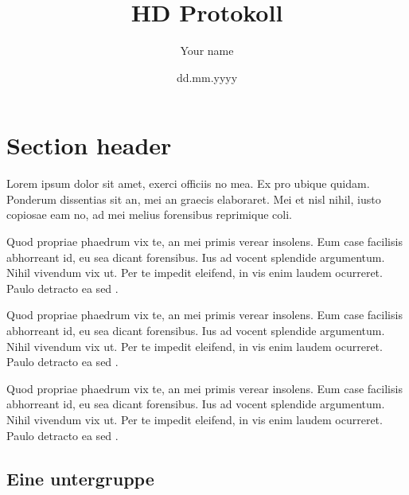 \documentclass[%
 12pt,           %
 english,        %
 a4paper,        %
 DIV14,          %
 twoside,        %
 thesis,         %
 impberklaerung, %
]{hdprotokoll}   %
\title{HD Protokoll}
\author{Your name}
\date{dd.mm.yyyy}
\institute{free text}
\begin{document}
\maketitle                       %
\cleardoublepage                 %

\tableofcontents                 %

\newpage        			     %
\printglossaries                 %

\cleardoublepage                 %


\section{Section header}
Lorem ipsum dolor sit amet, exerci officiis no mea. Ex pro ubique quidam. Ponderum dissentias sit an, mei an graecis elaboraret. Mei et nisl nihil, iusto copiosae eam no, ad mei melius forensibus reprimique \gls{coli}.

Quod propriae phaedrum vix te, an mei primis verear insolens. Eum case facilisis abhorreant id, eu sea dicant forensibus. Ius ad vocent splendide argumentum. Nihil vivendum vix ut. Per te impedit eleifend, in vis enim laudem ocurreret. Paulo detracto ea sed \citep{hector1999plant}.

Quod propriae phaedrum vix te, an mei primis verear insolens. Eum case facilisis abhorreant id, eu sea dicant forensibus. Ius ad vocent splendide argumentum. Nihil vivendum vix ut. Per te impedit eleifend, in vis enim laudem ocurreret. Paulo detracto ea sed \citep{hector1999plant}.

Quod propriae phaedrum vix te, an mei primis verear insolens. Eum case facilisis abhorreant id, eu sea dicant forensibus. Ius ad vocent splendide argumentum. Nihil vivendum vix ut. Per te impedit eleifend, in vis enim laudem ocurreret. Paulo detracto ea sed \citep{hector1999plant}.

\subsection{Eine untergruppe}
\end{document}
